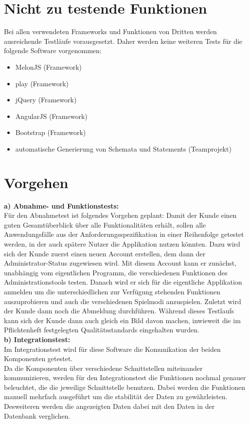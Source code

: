 \section{Nicht zu testende Funktionen}

Bei allen verwendeten Frameworks und Funktionen von Dritten werden ausreichende Testläufe vorausgesetzt. Daher werden keine weiteren Tests für die folgende Software vorgenommen:
\begin{itemize}
\item MelonJS (Framework)
\item play (Framework)
\item jQuery (Framework)
\item AngularJS (Framework)
\item Bootstrap (Framework)
\item automatische Generierung von Schemata und Statements (Teamprojekt)
\end{itemize}

\section{Vorgehen}

\textbf{a) Abnahme- und Funktionstests:} \\
Für den Abnahmetest ist folgendes Vorgehen geplant: Damit der Kunde einen guten Gesamtüberblick über alle Funktionalitäten erhält, sollen alle Anwendungsfälle aus der Anforderungsspezifikation in einer Reihenfolge getestet werden, in der auch spätere Nutzer die Applikation nutzen könnten. 
Dazu wird sich der Kunde zuerst einen neuen Account erstellen, dem dann der Administrator-Status zugewiesen wird. Mit diesem Account kann er zunächst, unabhängig vom eigentlichen Programm, die verschiedenen Funktionen des Administrationstools testen. Danach wird er sich für die eigentliche Applikation anmelden um die unterschiedlichen zur Verfügung stehenden Funktionen auszuprobieren und auch die verschiedenen Spielmodi anzuspielen. Zuletzt wird der Kunde dann noch die Abmeldung durchführen.
Während dieses Testlaufs kann sich der Kunde dann auch gleich ein Bild davon machen, inwieweit die im Pflichtenheft festgelegten Qualitätsstandards eingehalten wurden.\\

\newpage
 \textbf{b) Integrationstest:} \\
 Im Integrationstest wird für diese Software die Komunikation der beiden Komponenten getestet.\\
 Da die Komponenten über verschiedene Schnittstellen miteinander kommunizieren, werden für den Integrationstest die Funktionen nochmal genauer beleuchtet, die die jeweilige Schnittstelle benutzen. Dabei werden die Funktionen manuell mehrfach ausgeführt um die stabilität der Daten zu gewährleisten. Desweiteren werden die angezeigten Daten dabei mit den Daten in der Datenbank verglichen.  \\ 
 

